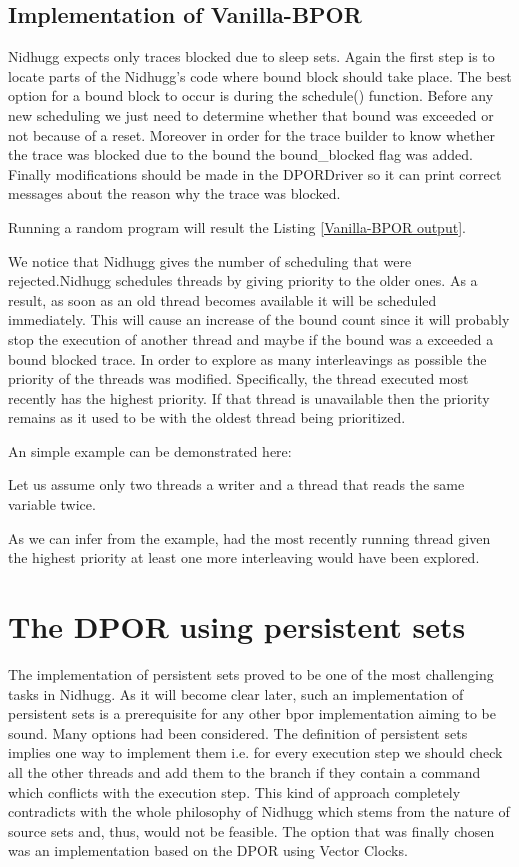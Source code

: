 \subsection{Implementation of Vanilla-BPOR}
Nidhugg expects only traces blocked due to sleep sets. Again the first step is to locate parts of the Nidhugg's code where 
bound block should take place. The best option for a bound block to occur is during the schedule() function. Before any new scheduling
we just need to determine whether that bound was exceeded or not because of a reset.
Moreover in order for the trace builder to know whether the trace was blocked due to the bound the bound\_blocked flag was added.
Finally modifications should be made in the DPORDriver so it can print correct messages about the reason why the trace was blocked.

Running a random program will result the Listing \ref{Vanilla-BPOR output}.

We notice that Nidhugg gives the number of scheduling that were rejected.Nidhugg schedules threads by giving priority to the older ones. As a result, as 
soon as an old thread becomes available it will be scheduled immediately. This will cause an increase of the bound count since it will probably stop the execution of another thread and maybe if the bound
was a exceeded a bound blocked trace. In order to explore as many interleavings as possible the priority of the threads was modified.
Specifically, the thread executed most recently has the highest priority. If that thread is unavailable then the priority remains as it 
used to be with the oldest thread being prioritized.

An simple example can be demonstrated here:


Let us assume only two threads a writer and a thread that reads the same variable twice.

As we can infer from the example, had the most recently running thread given the highest priority at least one more interleaving would have
been explored.

\section{The DPOR using persistent sets}

The implementation of persistent sets proved to be one of the most challenging tasks in Nidhugg. As it will become clear later, such an implementation
of persistent sets is a prerequisite for any other bpor implementation aiming to be sound. Many options had been considered. The definition of persistent sets implies one way to implement them i.e. for every execution step we should
check all the other threads and add them to the branch if they contain a command which conflicts with the execution step. This kind of approach
completely contradicts with the whole philosophy of Nidhugg which stems from the nature of source sets and, thus, would not be feasible. 
The option that was finally chosen was an implementation based on the DPOR using Vector Clocks.

